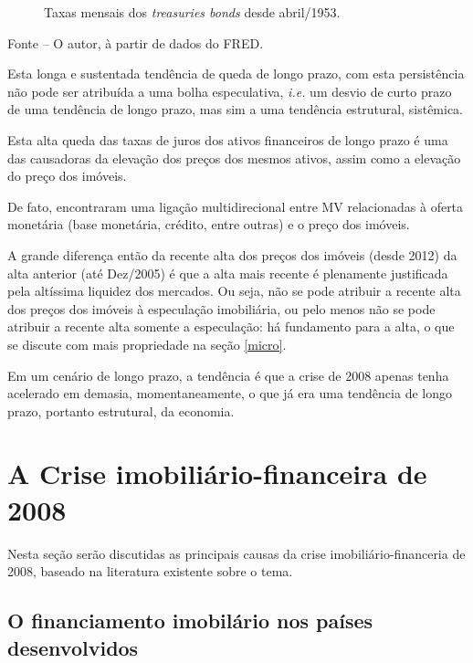 \documentclass[
	12pt,				%
	oneside,			%
	a4paper,			%
	chapter=TITLE,		%
	section=TITLE,		%
	english,			%
	brazil				%
	]{abntex2}
\newcommand{\bcenter}{\begin{center}}
\newcommand{\ecenter}{\end{center}}
\begin{document}
\begin{refsection}
\begin{figure}[H]
{}

\caption{Taxas mensais dos \emph{treasuries bonds} desde abril/1953.}\label{fig:fred}
\end{figure}
\bcenter

\small Fonte -- O autor, à partir de dados do \gls{FRED}.
\ecenter

Esta longa e sustentada tendência de queda de longo prazo, com esta persistência
não pode ser atribuída a uma bolha especulativa, \emph{i.e.} um desvio de curto prazo
de uma tendência de longo prazo, mas sim a uma tendência estrutural, sistêmica.

Esta alta queda das taxas de juros dos ativos financeiros de longo prazo é uma
das causadoras da elevação dos preços dos mesmos ativos, assim como a elevação
do preço dos imóveis.

De fato, \textcite{goodhart2008} encontraram uma ligação multidirecional entre \gls{MV}
relacionadas à oferta monetária (base monetária, crédito, entre outras) e o
preço dos imóveis.

A grande diferença então da recente alta dos preços dos imóveis (desde 2012) da
alta anterior (até Dez/2005) é que a alta mais recente é plenamente justificada
pela altíssima liquidez dos mercados. Ou seja, não se pode atribuir a recente
alta dos preços dos imóveis à especulação imobiliária, ou pelo menos não se pode
atribuir a recente alta somente a especulação: há fundamento para a alta, o que
se discute com mais propriedade na seção \ref{micro}.

Em um cenário de longo prazo, a tendência é que a crise de 2008 apenas tenha
acelerado em demasia, momentaneamente, o que já era uma tendência de longo
prazo, portanto estrutural, da economia.

\hypertarget{a-crise-imobiliuxe1rio-financeira-de-2008}{%
\section{A Crise imobiliário-financeira de 2008}\label{a-crise-imobiliuxe1rio-financeira-de-2008}}

Nesta seção serão discutidas as principais causas da crise
imobiliário-financeria de 2008, baseado na literatura existente sobre o tema.

\hypertarget{o-financiamento-imobiluxe1rio-nos-pauxedses-desenvolvidos}{%
\subsection{O financiamento imobilário nos países desenvolvidos}\label{o-financiamento-imobiluxe1rio-nos-pauxedses-desenvolvidos}}


\end{refsection}
\end{document}
